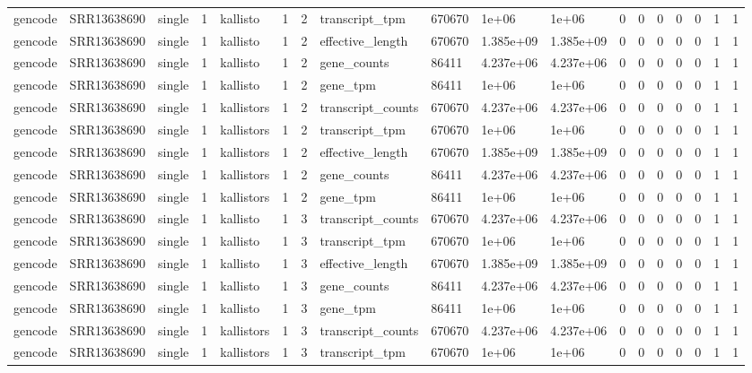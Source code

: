 \begin{tabular}{llllllllllllllllll}
gencode & SRR13638690 & single & 1 & kallisto & 1 & 2 & transcript\_tpm & 670670 & 1e+06 & 1e+06 & 0 & 0 & 0 & 0 & 0 & 1 & 1 \\
gencode & SRR13638690 & single & 1 & kallisto & 1 & 2 & effective\_length & 670670 & 1.385e+09 & 1.385e+09 & 0 & 0 & 0 & 0 & 0 & 1 & 1 \\
gencode & SRR13638690 & single & 1 & kallisto & 1 & 2 & gene\_counts & 86411 & 4.237e+06 & 4.237e+06 & 0 & 0 & 0 & 0 & 0 & 1 & 1 \\
gencode & SRR13638690 & single & 1 & kallisto & 1 & 2 & gene\_tpm & 86411 & 1e+06 & 1e+06 & 0 & 0 & 0 & 0 & 0 & 1 & 1 \\
gencode & SRR13638690 & single & 1 & kallistors & 1 & 2 & transcript\_counts & 670670 & 4.237e+06 & 4.237e+06 & 0 & 0 & 0 & 0 & 0 & 1 & 1 \\
gencode & SRR13638690 & single & 1 & kallistors & 1 & 2 & transcript\_tpm & 670670 & 1e+06 & 1e+06 & 0 & 0 & 0 & 0 & 0 & 1 & 1 \\
gencode & SRR13638690 & single & 1 & kallistors & 1 & 2 & effective\_length & 670670 & 1.385e+09 & 1.385e+09 & 0 & 0 & 0 & 0 & 0 & 1 & 1 \\
gencode & SRR13638690 & single & 1 & kallistors & 1 & 2 & gene\_counts & 86411 & 4.237e+06 & 4.237e+06 & 0 & 0 & 0 & 0 & 0 & 1 & 1 \\
gencode & SRR13638690 & single & 1 & kallistors & 1 & 2 & gene\_tpm & 86411 & 1e+06 & 1e+06 & 0 & 0 & 0 & 0 & 0 & 1 & 1 \\
gencode & SRR13638690 & single & 1 & kallisto & 1 & 3 & transcript\_counts & 670670 & 4.237e+06 & 4.237e+06 & 0 & 0 & 0 & 0 & 0 & 1 & 1 \\
gencode & SRR13638690 & single & 1 & kallisto & 1 & 3 & transcript\_tpm & 670670 & 1e+06 & 1e+06 & 0 & 0 & 0 & 0 & 0 & 1 & 1 \\
gencode & SRR13638690 & single & 1 & kallisto & 1 & 3 & effective\_length & 670670 & 1.385e+09 & 1.385e+09 & 0 & 0 & 0 & 0 & 0 & 1 & 1 \\
gencode & SRR13638690 & single & 1 & kallisto & 1 & 3 & gene\_counts & 86411 & 4.237e+06 & 4.237e+06 & 0 & 0 & 0 & 0 & 0 & 1 & 1 \\
gencode & SRR13638690 & single & 1 & kallisto & 1 & 3 & gene\_tpm & 86411 & 1e+06 & 1e+06 & 0 & 0 & 0 & 0 & 0 & 1 & 1 \\
gencode & SRR13638690 & single & 1 & kallistors & 1 & 3 & transcript\_counts & 670670 & 4.237e+06 & 4.237e+06 & 0 & 0 & 0 & 0 & 0 & 1 & 1 \\
gencode & SRR13638690 & single & 1 & kallistors & 1 & 3 & transcript\_tpm & 670670 & 1e+06 & 1e+06 & 0 & 0 & 0 & 0 & 0 & 1 & 1 \\

\end{tabular}
